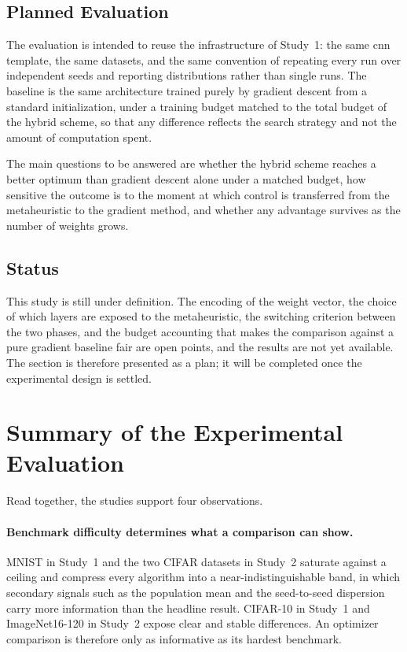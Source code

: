\subsection{Planned Evaluation}
\label{subsec:study3_plan}

The evaluation is intended to reuse the infrastructure of Study~1: the same \acrshort{cnn} template, the same datasets, and the same convention of repeating every run over independent seeds and reporting distributions rather than single runs. The baseline is the same architecture trained purely by gradient descent from a standard initialization, under a training budget matched to the total budget of the hybrid scheme, so that any difference reflects the search strategy and not the amount of computation spent.

The main questions to be answered are whether the hybrid scheme reaches a better optimum than gradient descent alone under a matched budget, how sensitive the outcome is to the moment at which control is transferred from the metaheuristic to the gradient method, and whether any advantage survives as the number of weights grows.

\subsection{Status}
\label{subsec:study3_status}

This study is still under definition. The encoding of the weight vector, the choice of which layers are exposed to the metaheuristic, the switching criterion between the two phases, and the budget accounting that makes the comparison against a pure gradient baseline fair are open points, and the results are not yet available. The section is therefore presented as a plan; it will be completed once the experimental design is settled.


\section{Summary of the Experimental Evaluation}
\label{sec:experimental_summary}

Read together, the studies support four observations.

\paragraph{Benchmark difficulty determines what a comparison can show.}
MNIST in Study~1 and the two CIFAR datasets in Study~2 saturate against a ceiling and compress every algorithm into a near-indistinguishable band, in which secondary signals such as the population mean and the seed-to-seed dispersion carry more information than the headline result. CIFAR-10 in Study~1 and ImageNet16-120 in Study~2 expose clear and stable differences. An optimizer comparison is therefore only as informative as its hardest benchmark.

